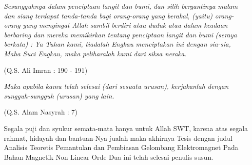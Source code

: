 \documentclass[tesis]{ugmtesis}
\begin{document}
\cover

\titlepageind 

\approvalpage

\declarepage

\acknowledment
\begin{flushright}
\Large\emph{}
\end{flushright}

\motto
\emph{Sesungguhnya dalam penciptaan langit dan bumi, dan silih bergantinya
malam dan siang terdapat tanda-tanda bagi orang-orang yang berakal, (yaitu)
orang-orang yang mengingat Allah sambil berdiri atau duduk atau dalam keadaan
berbaring dan mereka memikirkan tentang penciptaan langit dan bumi (seraya
berkata) : Ya Tuhan kami, tiadalah Engkau menciptakan ini dengan sia-sia, Maha
Suci Engkau, maka peliharalah kami dari siksa neraka.}

\begin{flushright}
(Q.S. Ali Imran : 190 - 191)
\end{flushright}

\emph{Maka apabila kamu telah selesai (dari sesuatu urusan), kerjakanlah
dengan sungguh-sungguh (urusan) yang lain.}

\begin{flushright}
(Q.S. Alam Nasyrah : 7)
\end{flushright}

\preface
Segala puji dan syukur semata-mata hanya untuk Allah SWT, karena atas segala
rahmat, hidayah dan bantuan-Nya jualah maka akhirnya Tesis dengan judul
Analisis Teoretis Pemantulan dan Pembiasan Gelombang Elektromagnet Pada
Bahan Magnetik Non Linear Orde Dua ini telah selesai penulis susun.
\end{document}
